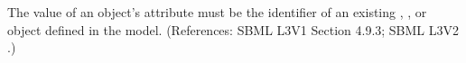 The value of an \AssignmentRule object's  attribute must be
the identifier of an existing \Compartment, \Species, \Parameter or
\SpeciesReference object defined in the model.  (References: SBML L3V1 Section 4.9.3; SBML L3V2
.)
